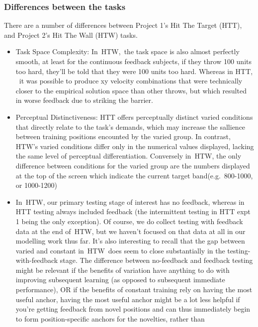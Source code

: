 \documentclass[
  12pt,
  letterpaper,
]{article}
\begin{document}
\subsubsection{Differences between the
tasks}\label{differences-between-the-tasks}

There are a number of differences between Project 1's Hit The Target
(HTT), and Project 2's Hit The Wall (HTW) tasks.

\begin{itemize}
\item
  Task Space Complexity: In~HTW,~the task space is also almost perfectly
  smooth, at least for the continuous feedback subjects, if they throw
  100 units too hard, they'll be told that they were 100 units too hard.
  Whereas in HTT, ~it was possible to produce xy velocity combinations
  that were technically closer to the empirical solution space than
  other throws, but which resulted in worse feedback due to striking the
  barrier.
\item
  Perceptual Distinctiveness: HTT offers perceptually distinct varied
  conditions that directly relate to the task's demands, which may
  increase the sallience between training positions encounted by the
  varied group. In contrast, HTW's varied conditions differ only in the
  numerical values displayed, lacking the same level of perceptual
  differentiation. Conversely in~HTW, the only difference between
  conditions for the varied group are the numbers displayed at the top
  of the screen which indicate the current target band(e.g.~800-1000, or
  1000-1200)
\item
  In~HTW, our primary testing stage of interest has no feedback, whereas
  in HTT testing always included feedback (the intermittent testing in
  HTT expt 1 being the only exception). Of course, we do collect testing
  with feedback data at the end of~HTW, but we haven't focused on that
  data at all in our modelling work thus far. It's also interesting to
  recall that the gap between varied and constant in~HTW~does seem to
  close substantially in the testing-with-feedback stage. The difference
  between no-feedback and feedback testing might be relevant if the
  benefits of variation have anything to do with improving subsequent
  learning (as opposed to subsequent immediate performance), OR if the
  benefits of constant training rely on having the most useful anchor,
  having the most useful anchor might be a lot less helpful if you're
  getting feedback from novel positions and can thus immediately begin
  to form position-specific anchors for the novelties, rather than

\end{itemize}
\end{document}
